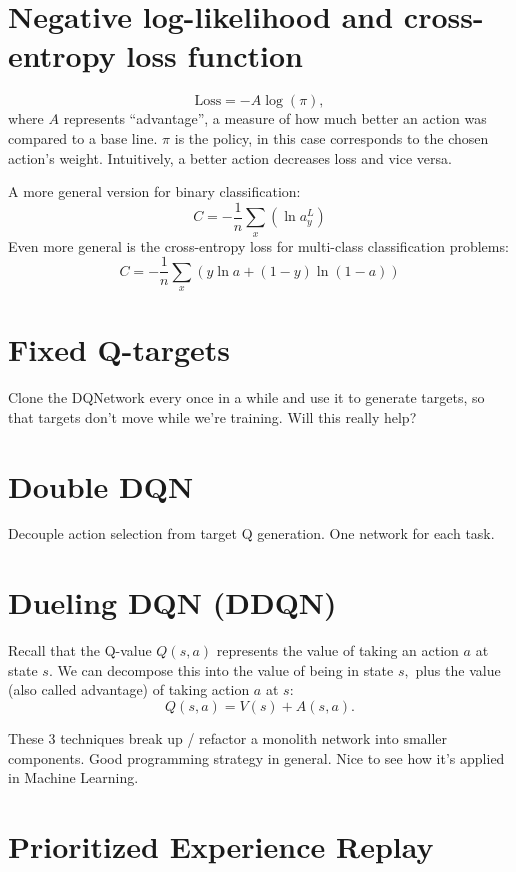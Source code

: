 \documentclass[17pt]{extarticle}
\theoremstyle{plain}
\theoremstyle{definition}
\theoremstyle{remark}
\newcommand{\0}{\varnothing}
\newcommand{\<}{\langle}
\renewcommand{\>}{\rangle}
\begin{document}
\section{Negative log-likelihood and cross-entropy loss function}

\[
\text{Loss} = - A \log(\pi),
\]
where \( A \) represents ``advantage'', a measure of how much better an action was
compared to a base line. \( \pi \) is the policy, in this case corresponds to
the chosen action's weight. Intuitively, a better action decreases loss and vice
versa.

A more general version for binary classification:
\[
C = - \frac { 1 } { n } \sum _ { x } \left( \ln a _ { y } ^ { L } \right)
\]
Even more general is the cross-entropy loss for multi-class classification problems:
\[
C = - \frac { 1 } { n } \sum _ { x } ( y \ln a + ( 1 - y ) \ln ( 1 - a ) )
\]

\section{Fixed Q-targets}

Clone the DQNetwork every once in a while and use it to generate targets, so that targets don't move while we're training. Will this really help?

\section{Double DQN}

Decouple action selection from target Q generation. One network for each task.

\section{Dueling DQN (DDQN)}

Recall that the Q-value $ Q(s, a) $ represents the value of taking an action $ a
$ at state $ s. $ We can decompose this into the value of being in state $ s, $
plus the value (also called advantage) of taking action $ a $ at $ s: $ $$
  Q(s, a) = V(s) + A(s, a).
$$

These 3 techniques break up / refactor a monolith network into smaller components. Good programming strategy in general. Nice to see how it's applied in Machine Learning.

\section{Prioritized Experience Replay}
\end{document}
